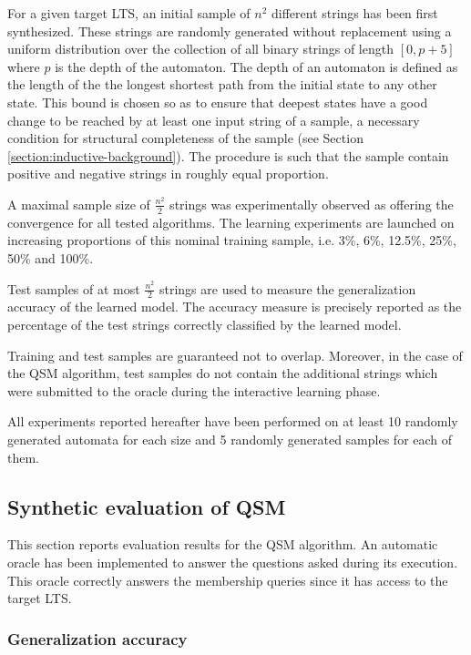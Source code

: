 For a given target LTS, an initial sample of $n^2$ different strings has been first synthesized. These strings are randomly generated without replacement using a uniform distribution over the collection of all binary strings of length $[0, p+5]$ where $p$ is the depth of the automaton. The depth of an automaton is defined as the length of the the longest shortest path from the initial state to any other state. This bound is chosen so as to ensure that deepest states have a good change to be reached by at least one input string of a sample, a necessary condition for structural completeness of the sample (see Section \ref{section:inductive-background}). The procedure is such that the sample contain positive and negative strings in roughly equal proportion.
 
A maximal sample size of $\frac{n^2}{2}$ strings was experimentally observed as offering the convergence for all tested algorithms. The learning experiments are launched on increasing proportions of this nominal training sample, i.e. 3\%, 6\%, 12.5\%, 25\%, 50\% and 100\%.

Test samples of at most $\frac{n^2}{2}$ strings are used to measure the generalization accuracy of the learned model. The accuracy measure is precisely reported as the percentage of the test strings correctly classified by the learned model.

Training and test samples are guaranteed not to overlap. Moreover, in the case of the QSM algorithm, test samples do not contain the additional strings which were submitted to the oracle during the interactive learning phase.

All experiments reported hereafter have been performed on at least 10 randomly generated automata for each size and 5 randomly generated samples for each of them.

\subsection{Synthetic evaluation of QSM\label{subsection:evaluation-synthetic-qsm}}

This section reports evaluation results for the QSM algorithm. An automatic oracle has been implemented to answer the questions asked during its execution. This oracle correctly answers the membership queries since it has access to the target LTS.

\subsubsection*{Generalization accuracy}


